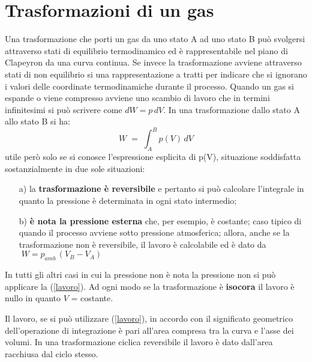 \documentclass[x11names]{report}
\begin{document}
	\section{Trasformazioni  di un gas}
	Una trasformazione che porti un gas da uno stato A ad uno stato B può svolgersi attraverso stati di equilibrio termodinamico ed è rappresentabile nel piano di Clapeyron da una curva continua. Se invece la trasformazione avviene attraverso stati di non equilibrio si una rappresentazione a tratti per indicare che si ignorano i valori delle coordinate termodinamiche durante il processo.
	Quando un gas si espande o viene compresso avviene uno scambio di lavoro che in termini infinitesimi si può scrivere come $dW = p\,dV$. In una trasformazione dallo stato A allo stato B si ha:
	\begin{equation}\label{lavoro}
		W \;=\; \int_{A}^{B} p(V)\,dV
	\end{equation}
	utile però solo se si conosce l'espressione esplicita di p(V), situazione soddisfatta sostanzialmente in due sole situazioni: 
	\begin{itemize}
		\item[a)] la \textbf{trasformazione è reversibile} e pertanto si può calcolare l'integrale in quanto la pressione è determinata in ogni stato intermedio; 
		\item[b)] \textbf{è nota la pressione esterna} che, per esempio, è costante; caso tipico di quando il processo avviene sotto pressione atmosferica; allora, anche se la trasformazione non è reversibile, il lavoro è calcolabile ed è dato da  $\;W = p_{amb}\,(V_B - V_A)$
	\end{itemize}
	In tutti gli altri casi in cui la pressione non è nota la pressione non si può applicare la (\ref{lavoro}). 
	Ad ogni modo se la trasformazione è \textbf{isocora} il lavoro è nullo in quanto $V$ = costante. 
	
	
	Il lavoro, se si può utilizzare (\ref{lavoro}), in accordo con il significato geometrico dell'operazione di integrazione è pari all'area compresa tra la curva e l'asse dei volumi. In una trasformazione ciclica reversibile il lavoro è dato dall'area racchiusa dal ciclo stesso.
	
\end{document}
